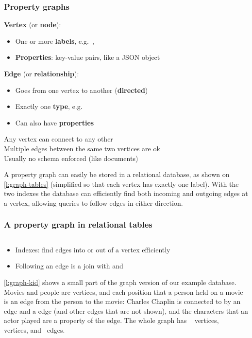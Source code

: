 \begin{frame}
    \label{s:property-graph}
    \frametitle{Property graphs}
    \textbf{Vertex} (or \textbf{node}):
    \begin{itemize}
        \item One or more \textbf{labels}, e.g.\ , 
        \item \textbf{Properties}: key-value pairs, like a JSON object\\[1em]\pause
    \end{itemize}
    \textbf{Edge} (or \textbf{relationship}):
    \begin{itemize}
        \item Goes from one vertex to another (\textbf{directed})
        \item Exactly one \textbf{type}, e.g.\ 
        \item Can also have \textbf{properties}\\[1em]\pause
    \end{itemize}
    Any vertex can connect to any other\\[0.5em]
    Multiple edges between the same two vertices are ok\\[0.5em]
    Usually no schema enforced (like documents)
\end{frame}
\label{l:property-graph}

A property graph can easily be stored in a relational database, as shown on \autoref{l:graph-tables} (simplified so that each vertex has exactly one label).
With the two indexes the database can efficiently find both incoming and outgoing edges at a vertex, allowing queries to follow edges in either direction.

\begin{frame}
    \label{s:graph-tables}
    \frametitle{A property graph in relational tables}
    \inputminted[fontsize=\footnotesize]{sql}{code/graph-tables.sql}
    \begin{itemize}
        \item Indexes: find edges into or out of a vertex efficiently
        \item Following an edge is a join with  and 
    \end{itemize}
\end{frame}
\label{l:graph-tables}

\autoref{l:graph-kid} shows a small part of the graph version of our example database.
Movies and people are vertices, and each position that a person held on a movie is an edge from the person to the movie: Charles Chaplin is connected to \emph{\graphkidkidtitle} by an  edge and a  edge (and other edges that are not shown), and the characters that an actor played are a property of the  edge.
The whole graph has \graphmovies\  vertices, \graphpeople\  vertices, and \graphedges\ edges.


